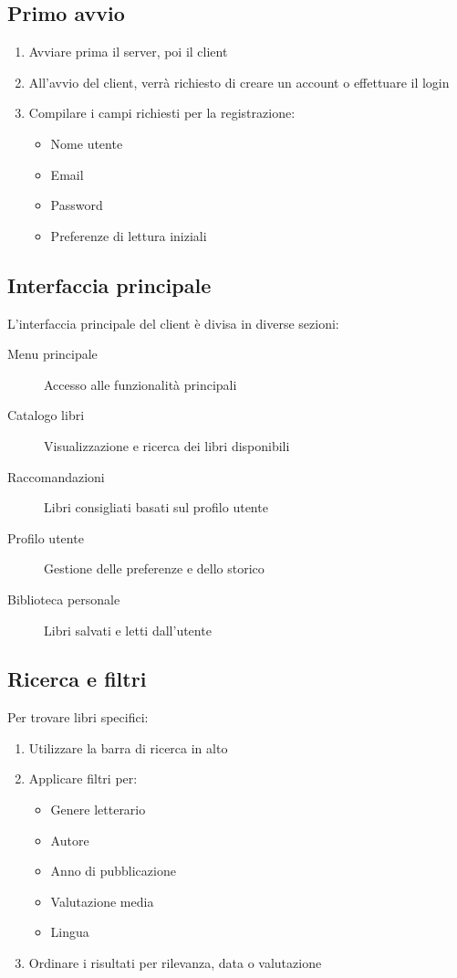 \documentclass[12pt,a4paper]{article}
\begin{document}
\subsection{Primo avvio}

\begin{enumerate}
    \item Avviare prima il server, poi il client
    \item All'avvio del client, verrà richiesto di creare un account o effettuare il login
    \item Compilare i campi richiesti per la registrazione:
    \begin{itemize}
        \item Nome utente
        \item Email
        \item Password
        \item Preferenze di lettura iniziali
    \end{itemize}
\end{enumerate}

\subsection{Interfaccia principale}

L'interfaccia principale del client è divisa in diverse sezioni:

\begin{description}
    \item[Menu principale] Accesso alle funzionalità principali
    \item[Catalogo libri] Visualizzazione e ricerca dei libri disponibili
    \item[Raccomandazioni] Libri consigliati basati sul profilo utente
    \item[Profilo utente] Gestione delle preferenze e dello storico
    \item[Biblioteca personale] Libri salvati e letti dall'utente
\end{description}

\subsection{Ricerca e filtri}

Per trovare libri specifici:

\begin{enumerate}
    \item Utilizzare la barra di ricerca in alto
    \item Applicare filtri per:
    \begin{itemize}
        \item Genere letterario
        \item Autore
        \item Anno di pubblicazione
        \item Valutazione media
        \item Lingua
    \end{itemize}
    \item Ordinare i risultati per rilevanza, data o valutazione
\end{enumerate}
\end{document}

